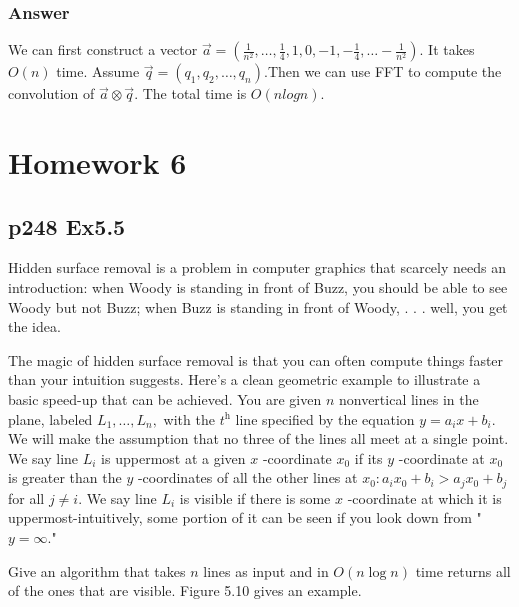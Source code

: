 \documentclass[a4paper]{article}
\begin{document}
\subsubsection*{Answer}
We can first construct a vector $\vec{a}=\left(\frac{1}{n^2}, \ldots, \frac{1}{4},1,0,-1,-\frac{1}{4},\ldots -\frac{1}{n^2}\right)$. It takes $O(n)$ time. Assume $\vec{q} = (q_1,q_2,\ldots, q_n). $Then we can use FFT to compute the convolution of $\vec{a}\otimes \vec{q}$. The total time is $O(nlogn)$.
\vspace{2cm}

\newpage
\section*{Homework 6}
\subsection*{p248 Ex5.5}
\begin{adjustwidth}{1cm}{1cm}
	Hidden surface removal is a problem in computer graphics that scarcely needs an introduction: when Woody is standing in front of Buzz, you should be able to see Woody but not Buzz; when Buzz is standing in front of Woody, . . . well, you get the idea.

	The magic of hidden surface removal is that you can often compute things faster than your intuition suggests. Here's a clean geometric example to illustrate a basic speed-up that can be achieved. You are given $n$ nonvertical lines in the plane, labeled $L_{1}, \ldots, L_{n},$ with the $t^{\mathrm{h}}$ line specified by the equation $y=a_{i} x+b_{i} .$ We will make the assumption that no three of the lines all meet at a single point. We say line $L_{i}$ is uppermost at a given $x$ -coordinate $x_{0}$ if its $y$ -coordinate at $x_{0}$ is greater than the $y$ -coordinates of all the other lines at $x_{0}: a_{i} x_{0}+b_{i}>a_{j} x_{0}+b_{j}$ for all $j \neq i .$ We say line $L_{i}$ is visible if there is some $x$ -coordinate at which it is uppermost-intuitively, some portion of it can be seen if you look down from " $y=\infty$."

	Give an algorithm that takes $n$ lines as input and in $O(n \log n)$ time returns all of the ones that are visible. Figure 5.10 gives an example.
\end{adjustwidth}
\end{document}
